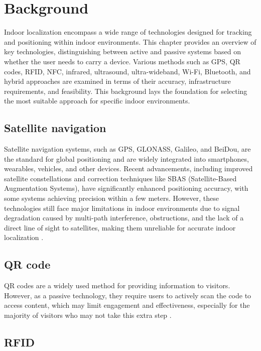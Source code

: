 \chapter{Background}
\label{chap:background}

Indoor localization encompass a wide range of technologies designed for tracking and positioning within indoor environments. This chapter provides an overview of key technologies, distinguishing between active and passive systems based on whether the user needs to carry a device. Various methods such as GPS, QR codes, RFID, NFC, infrared, ultrasound, ultra-wideband, Wi-Fi, Bluetooth, and hybrid approaches are examined in terms of their accuracy, infrastructure requirements, and feasibility. This background lays the foundation for selecting the most suitable approach for specific indoor environments.

\section{Satellite navigation}

Satellite navigation systems, such as GPS, GLONASS, Galileo, and BeiDou, are the standard for global positioning and are widely integrated into smartphones, wearables, vehicles, and other devices. Recent advancements, including improved satellite constellations and correction techniques like SBAS (Satellite-Based Augmentation Systems), have significantly enhanced positioning accuracy, with some systems achieving precision within a few meters. However, these technologies still face major limitations in indoor environments due to signal degradation caused by multi-path interference, obstructions, and the lack of a direct line of sight to satellites, making them unreliable for accurate indoor localization \cite{mainetti_survey_2014}. 

\section{QR code}

QR codes are a widely used method for providing information to visitors. However, as a passive technology, they require users to actively scan the code to access content, which may limit engagement and effectiveness, especially for the majority of visitors who may not take this extra step \cite{spachos_ble_2020}. 

\section{RFID}

